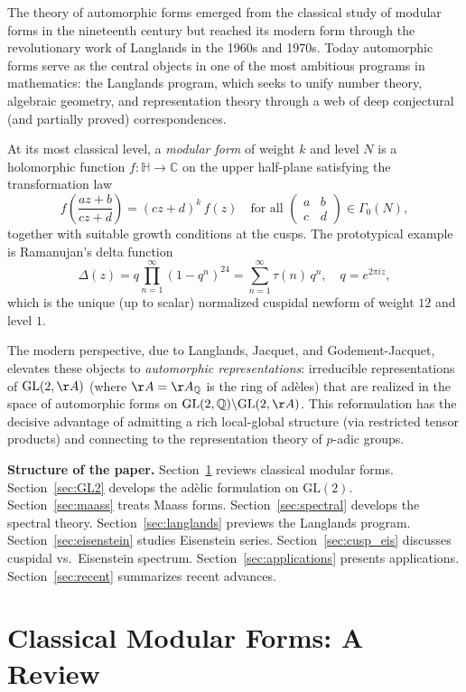 \documentclass[12pt,a4paper]{amsart}
\theoremstyle{definition}
\newcommand{\HH}{\mathbb{H}}
\newcommand{\QQ}{\mathbb{Q}}
\newcommand{\CC}{\mathbb{C}}
\newcommand{\GL}{\mathrm{GL}}
\begin{document}
The theory of automorphic forms emerged from the classical study of modular forms
in the nineteenth century but reached its modern form through the revolutionary
work of Langlands in the 1960s and 1970s. Today automorphic forms serve as the
central objects in one of the most ambitious programs in mathematics: the Langlands
program, which seeks to unify number theory, algebraic geometry, and representation
theory through a web of deep conjectural (and partially proved) correspondences.

At its most classical level, a \emph{modular form} of weight $k$ and level $N$ is
a holomorphic function $f: \HH \to \CC$ on the upper half-plane satisfying the
transformation law
\[
f\!\left(\frac{az+b}{cz+d}\right) = (cz+d)^k\, f(z)
\quad \text{for all } \begin{pmatrix}a&b\\c&d\end{pmatrix} \in \Gamma_0(N),
\]
together with suitable growth conditions at the cusps. The prototypical example is
Ramanujan's delta function
\[
\Delta(z) = q \prod_{n=1}^\infty (1-q^n)^{24} = \sum_{n=1}^\infty \tau(n)\, q^n,
\quad q = e^{2\pi i z},
\]
which is the unique (up to scalar) normalized cuspidal newform of weight $12$ and
level $1$.

The modern perspective, due to Langlands, Jacquet, and Godement-Jacquet, elevates
these objects to \emph{automorphic representations}: irreducible representations
of $\GL(2,\AA)$ (where $\AA = \AA_\QQ$ is the ring of adèles) that are realized
in the space of automorphic forms on $\GL(2,\QQ) \backslash \GL(2,\AA)$. This
reformulation has the decisive advantage of admitting a rich local-global structure
(via restricted tensor products) and connecting to the representation theory of
$p$-adic groups.

\medskip
\noindent\textbf{Structure of the paper.}
Section~\ref{sec:classical} reviews classical modular forms.
Section~\ref{sec:GL2} develops the adèlic formulation on $\GL(2)$.
Section~\ref{sec:maass} treats Maass forms.
Section~\ref{sec:spectral} develops the spectral theory.
Section~\ref{sec:langlands} previews the Langlands program.
Section~\ref{sec:eisenstein} studies Eisenstein series.
Section~\ref{sec:cusp_eis} discusses cuspidal vs.\ Eisenstein spectrum.
Section~\ref{sec:applications} presents applications.
Section~\ref{sec:recent} summarizes recent advances.

\section{Classical Modular Forms: A Review}
\label{sec:classical}
\end{document}
